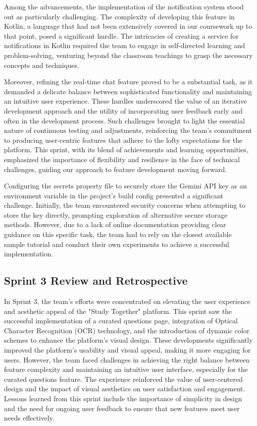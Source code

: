 Among the advancements, the implementation of the notification system stood out as particularly challenging. The complexity of developing this feature in Kotlin, a language that had not been extensively covered in our coursework up to that point, posed a significant hurdle. The intricacies of creating a service for notifications in Kotlin required the team to engage in self-directed learning and problem-solving, venturing beyond the classroom teachings to grasp the necessary concepts and techniques.

Moreover, refining the real-time chat feature proved to be a substantial task, as it demanded a delicate balance between sophisticated functionality and maintaining an intuitive user experience. These hurdles underscored the value of an iterative development approach and the utility of incorporating user feedback early and often in the development process. Such challenges brought to light the essential nature of continuous testing and adjustments, reinforcing the team's commitment to producing user-centric features that adhere to the lofty expectations for the platform. This sprint, with its blend of achievements and learning opportunities, emphasized the importance of flexibility and resilience in the face of technical challenges, guiding our approach to feature development moving forward.

Configuring the secrets property file to securely store the Gemini API key as an environment variable in the project's build config presented a significant challenge. Initially, the team encountered security concerns when attempting to store the key directly, prompting exploration of alternative secure storage methods. However, due to a lack of online documentation providing clear guidance on this specific task, the team had to rely on the closest available sample tutorial and conduct their own experiments to achieve a successful implementation.

\subsection{Sprint 3 Review and Retrospective}\label{sprint3_review_retrospective}
In Sprint 3, the team's efforts were concentrated on elevating the user experience and aesthetic appeal of the "Study Together" platform. This sprint saw the successful implementation of a curated questions page, integration of Optical Character Recognition (OCR) technology, and the introduction of dynamic color schemes to enhance the platform's visual design. These developments significantly improved the platform's usability and visual appeal, making it more engaging for users. However, the team faced challenges in achieving the right balance between feature complexity and maintaining an intuitive user interface, especially for the curated questions feature. The experience reinforced the value of user-centered design and the impact of visual aesthetics on user satisfaction and engagement. Lessons learned from this sprint include the importance of simplicity in design and the need for ongoing user feedback to ensure that new features meet user needs effectively.


